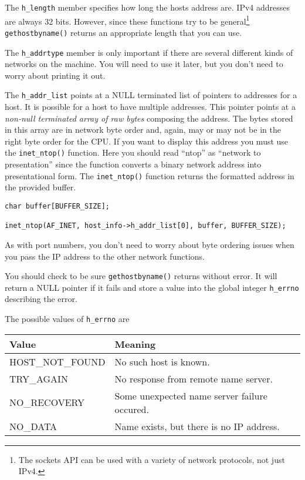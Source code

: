 \documentclass{article}
\begin{document}
The \texttt{h\_length} member specifies how long the hosts address are. IPv4 addresses are always 32 bits. However, since these functions try to be general\footnote{The sockets API can be used with a variety of network protocols, not just IPv4.} \texttt{gethostbyname()} returns an appropriate length that you can use.

The \texttt{h\_addrtype} member is only important if there are several different kinds of networks on the machine. You will need to use it later, but you don't need to worry about printing it out.

The \texttt{h\_addr\_list} points at a NULL terminated list of pointers to addresses for a host. It is possible for a host to have multiple addresses. This pointer points at a \emph{non-null terminated array of raw bytes} composing the address. The bytes stored in this array are in network byte order and, again, may or may not be in the right byte order for the CPU. If you want to display this address you must use the \texttt{inet\_ntop()} function. Here you should read ``ntop'' as ``network to presentation'' since the function converts a binary network address into presentational form. The \texttt{inet\_ntop()} function returns the formatted address in the provided buffer.

\begin{verbatim}
char buffer[BUFFER_SIZE];

inet_ntop(AF_INET, host_info->h_addr_list[0], buffer, BUFFER_SIZE);
\end{verbatim}

As with port numbers, you don't need to worry about byte ordering issues when you pass the IP address to the other network functions.

You should check to be sure \texttt{gethostbyname()} returns without error. It will return a NULL pointer if it fails and store a value into the global integer \texttt{h\_errno} describing the error.

The possible values of \texttt{h\_errno} are

\begin{tabular}{|l|l|} \hline
Value              &  Meaning                                \\ \hline \hline
HOST\_NOT\_FOUND   &  No such host is known.                        \\ \hline
TRY\_AGAIN         &  No response from remote name server.          \\ \hline
NO\_RECOVERY       &  Some unexpected name server failure occured.  \\ \hline
NO\_DATA           &  Name exists, but there is no IP address.      \\ \hline
\end{tabular}
\end{document}
